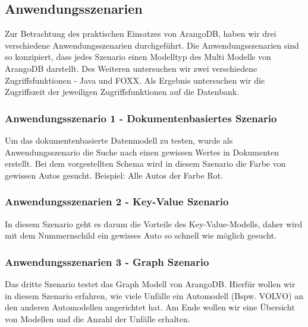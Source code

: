 \subsection{Anwendungsszenarien}
Zur Betrachtung des praktischen Einsatzes von ArangoDB, haben wir drei verschiedene Anwendungsszenarien durchgeführt. Die Anwendungsszenarien sind so konzipiert, dass jedes Szenario einen Modelltyp des Multi Modells von ArangoDB darstellt. Des Weiteren untersuchen wir zwei verschiedene Zugriffsfunktionen - Java und FOXX. Als Ergebnis untersuchen wir die Zugriffszeit der jeweiligen Zugriffsfunktionen auf die Datenbank.
\subsubsection{Anwendungsszenario 1 - Dokumentenbasiertes Szenario}
Um das dokumentenbasierte Datenmodell zu testen, wurde als Anwendungsszenario die Suche nach einen gewissen Wertes in Dokumenten erstellt. Bei dem vorgestellten Schema wird in diesem Szenario die Farbe von gewissen Autos gesucht. Beispiel: Alle Autos der Farbe Rot.
\subsubsection{Anwendungsszenarien 2 - Key-Value Szenario}
In diesem Szenario geht es darum die Vorteile des Key-Value-Modells, daher wird mit dem Nummernschild ein gewisses Auto so schnell wie möglich gesucht.
\subsubsection{Anwendungsszenarien 3 - Graph Szenario}
Das dritte Szenario testet das Graph Modell von ArangoDB. Hierfür wollen wir in diesem Szenario erfahren, wie viele Unfälle ein Automodell (Bspw. VOLVO) an den anderen Automodellen angerichtet hat. Am Ende wollen wir eine Übersicht von Modellen und die Anzahl der Unfälle erhalten.